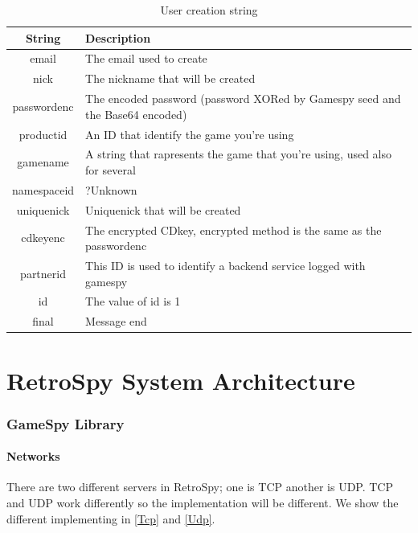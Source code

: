 \documentclass[oneside,titlepage,a4paper]{report} %
\begin{document}
\begin{table}[H]
	\centering
	\begin{tabular}{|c|>{\centering\arraybackslash}p{9cm}|}
		\hline
		  String    & Description                                                                  \\ \hline
		   email    & The email used to create                                                     \\ \hline
		   nick     & The nickname that will be created                                            \\ \hline
		passwordenc & The encoded password (password XORed by Gamespy seed and the Base64 encoded) \\ \hline
		 productid  & An ID that identify the game you're using                                    \\ \hline
		 gamename   & A string that rapresents the game that you're using, used also for several   \\ \hline
		namespaceid & ?Unknown                                                                     \\ \hline
		uniquenick  & Uniquenick that will be created                                              \\ \hline
		 cdkeyenc   & The encrypted CDkey, encrypted method is the same as the passwordenc         \\ \hline
		 partnerid  & This ID is used to identify a backend service logged with gamespy            \\ \hline
		    id      & The value of id is 1                                                         \\ \hline
		   final    & Message end                                                                  \\ \hline
	\end{tabular}
\caption{User creation string}
\label{User creation string}
\end{table}
\part{RetroSpy System Architecture}
\section{GameSpy Library}
	\subsection{Networks}
	 There are two different servers in RetroSpy; one is TCP another is UDP.  TCP and UDP work differently so the implementation will be different. We show the different implementing in \ref{Tcp} and \ref{Udp}.
\end{document}
